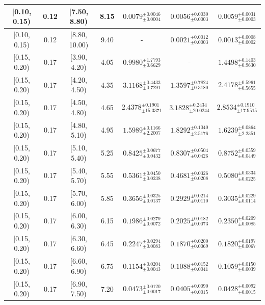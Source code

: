 \begin{longtable}{|c|c|c|c|c|c|c|}
\hline
[0.10, 0.15) & 0.12 & [7.50, 8.80) & 8.15 & $0.0079^{ \pm 0.0046 }_{ \pm 0.0004 }$ & $0.0056^{ \pm 0.0030 }_{ \pm 0.0003 }$ & $0.0059^{ \pm 0.0031 }_{ \pm 0.0003 }$ \\ 
\hline
[0.10, 0.15) & 0.12 & [8.80, 10.00) & 9.40 & - & $0.0021^{ \pm 0.0012 }_{ \pm 0.0003 }$ & $0.0013^{ \pm 0.0008 }_{ \pm 0.0002 }$ \\ 
\hline
[0.15, 0.20) & 0.17 & [3.90, 4.20) & 4.05 & $0.9980^{ \pm 1.7793 }_{ \pm 0.6629 }$ & - & $1.4498^{ \pm 0.1403 }_{ \pm 0.9630 }$ \\ 
\hline
[0.15, 0.20) & 0.17 & [4.20, 4.50) & 4.35 & $3.1168^{ \pm 0.4433 }_{ \pm 0.7291 }$ & $1.3597^{ \pm 0.7824 }_{ \pm 0.3180 }$ & $2.4178^{ \pm 0.5961 }_{ \pm 0.5655 }$ \\ 
\hline
[0.15, 0.20) & 0.17 & [4.50, 4.80) & 4.65 & $2.4378^{ \pm 0.1901 }_{ \pm 15.3371 }$ & $3.1828^{ \pm 0.2434 }_{ \pm 20.0244 }$ & $2.8534^{ \pm 0.1910 }_{ \pm 17.9515 }$ \\ 
\hline
[0.15, 0.20) & 0.17 & [4.80, 5.10) & 4.95 & $1.5989^{ \pm 0.1166 }_{ \pm 2.2007 }$ & $1.8292^{ \pm 0.1040 }_{ \pm 2.5176 }$ & $1.6239^{ \pm 0.0864 }_{ \pm 2.2351 }$ \\ 
\hline
[0.15, 0.20) & 0.17 & [5.10, 5.40) & 5.25 & $0.8425^{ \pm 0.0677 }_{ \pm 0.0432 }$ & $0.8307^{ \pm 0.0504 }_{ \pm 0.0426 }$ & $0.8752^{ \pm 0.0559 }_{ \pm 0.0449 }$ \\ 
\hline
[0.15, 0.20) & 0.17 & [5.40, 5.70) & 5.55 & $0.5361^{ \pm 0.0450 }_{ \pm 0.0238 }$ & $0.4681^{ \pm 0.0326 }_{ \pm 0.0208 }$ & $0.5080^{ \pm 0.0334 }_{ \pm 0.0225 }$ \\ 
\hline
[0.15, 0.20) & 0.17 & [5.70, 6.00) & 5.85 & $0.3656^{ \pm 0.0325 }_{ \pm 0.0137 }$ & $0.2929^{ \pm 0.0214 }_{ \pm 0.0110 }$ & $0.3035^{ \pm 0.0229 }_{ \pm 0.0114 }$ \\ 
\hline
[0.15, 0.20) & 0.17 & [6.00, 6.30) & 6.15 & $0.1986^{ \pm 0.0279 }_{ \pm 0.0072 }$ & $0.2025^{ \pm 0.0182 }_{ \pm 0.0073 }$ & $0.2350^{ \pm 0.0209 }_{ \pm 0.0085 }$ \\ 
\hline
[0.15, 0.20) & 0.17 & [6.30, 6.60) & 6.45 & $0.2247^{ \pm 0.0294 }_{ \pm 0.0083 }$ & $0.1870^{ \pm 0.0200 }_{ \pm 0.0069 }$ & $0.1820^{ \pm 0.0197 }_{ \pm 0.0067 }$ \\ 
\hline
[0.15, 0.20) & 0.17 & [6.60, 6.90) & 6.75 & $0.1154^{ \pm 0.0204 }_{ \pm 0.0043 }$ & $0.1088^{ \pm 0.0152 }_{ \pm 0.0041 }$ & $0.1059^{ \pm 0.0150 }_{ \pm 0.0039 }$ \\ 
\hline
[0.15, 0.20) & 0.17 & [6.90, 7.50) & 7.20 & $0.0473^{ \pm 0.0120 }_{ \pm 0.0017 }$ & $0.0405^{ \pm 0.0090 }_{ \pm 0.0015 }$ & $0.0428^{ \pm 0.0092 }_{ \pm 0.0015 }$ \\ 

\end{longtable}
